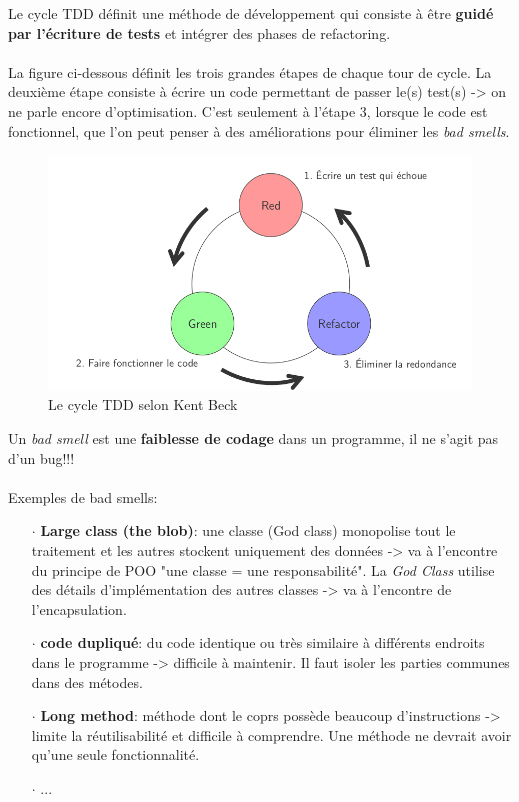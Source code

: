 \item{}
{Le cycle TDD définit une méthode de développement qui consiste à être \textbf{guidé par l'écriture de tests} et intégrer des phases de refactoring.
\paragraph{}
La figure ci-dessous définit les trois grandes étapes de chaque tour de cycle. La deuxième étape consiste à écrire un code permettant de passer le(s) test(s) -> on ne parle encore d'optimisation. C'est seulement à l'étape 3, lorsque le code est fonctionnel, que l'on peut penser à des améliorations pour éliminer les \textit{bad smells}.
\begin{figure}[h!]
\center\includegraphics[scale=.4]{images/cycle-tdd}
\caption{Le cycle TDD selon Kent Beck}
\end{figure}

}

\item{}
{Un \textit{bad smell} est une \textbf{faiblesse de codage} dans un programme, il ne s'agit pas d'un bug!!!
\paragraph{}Exemples de bad smells:
\begin{itemize}\setlength{\itemsep}{.3em}
\item[$\cdot$] \textbf{Large class (the blob)}: une classe (God class) monopolise tout le traitement et les autres stockent uniquement des données -> va à l'encontre du principe de POO "une classe = une responsabilité". La \textit{God Class} utilise des détails d'implémentation des autres classes -> va à l'encontre de l'encapsulation.
\item[$\cdot$]\textbf{code dupliqué}: du code identique ou très similaire à différents endroits dans le programme -> difficile à maintenir. Il faut isoler les parties communes dans des métodes.
\item[$\cdot$]\textbf{Long method}: méthode dont le coprs possède beaucoup d'instructions -> limite la réutilisabilité et difficile à comprendre. Une méthode ne devrait avoir qu'une seule fonctionnalité.
\item[$\cdot$]...
\end{itemize}
}

